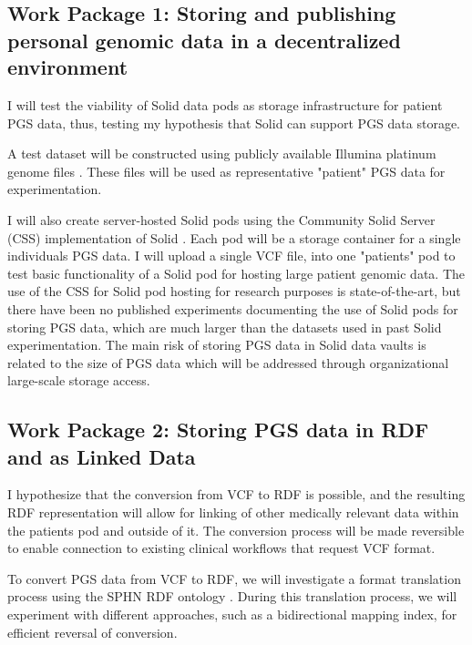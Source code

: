 \documentclass[runningheads]{llncs}
\begin{document}
\subsection{Work Package 1: Storing and publishing personal genomic data in a decentralized environment} 

I will test the viability of Solid data pods as storage infrastructure for patient PGS data, thus, testing my hypothesis that Solid can support PGS data storage. 

A test dataset will be constructed using publicly available Illumina platinum genome files \cite{noauthor_platinum_nodate}. 
These files will be used as representative "patient" PGS data for experimentation. 

I will also create server-hosted Solid pods using the Community Solid Server (CSS) implementation of Solid \cite{css}. 
Each pod will be a storage container for a single individual\textquotesingle s PGS data. 
I will upload a single VCF file, into one "patient\textquotesingle s" pod to test basic functionality of a Solid pod for hosting large patient genomic data. 
The use of the CSS for Solid pod hosting for research purposes is state-of-the-art, but there have been no published experiments documenting the use of Solid pods for storing PGS data, which are much larger than the datasets used in past Solid experimentation. 
The main risk of storing PGS data in Solid data vaults is related to the size of PGS data which will be addressed through organizational large-scale storage access. 


\subsection{Work Package 2:  Storing PGS data in RDF and as Linked Data}

I hypothesize that the conversion from VCF to RDF is possible, and the resulting RDF representation will allow for linking of other medically relevant data within the patient\textquotesingle s pod and outside of it.
The conversion process will be made reversible to enable connection to existing clinical workflows that request VCF format. 

To convert PGS data from VCF to RDF, we will investigate a format translation process using the SPHN RDF ontology \cite{van_der_horst_bridging_2023}. 
During this translation process, we will experiment with different approaches, such as a bidirectional mapping index, for efficient reversal of conversion.
\end{document}
